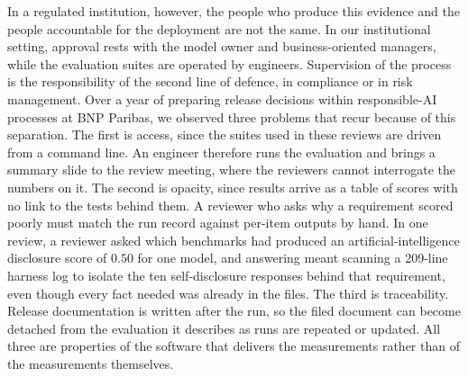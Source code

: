 \documentclass[10pt,conference,a4paper]{IEEEtran}
\begin{document}
In a regulated institution, however, the people who produce this evidence and the people accountable for the deployment are not the same.
In our institutional setting, approval rests with the model owner and business-oriented managers, while the evaluation suites are operated by engineers.
Supervision of the process is the responsibility of the second line of defence, in compliance or in risk management.
Over a year of preparing release decisions within responsible-AI processes at BNP Paribas, we observed three problems that recur because of this separation.
The first is access, since the suites used in these reviews are driven from a command line.
An engineer therefore runs the evaluation and brings a summary slide to the review meeting, where the reviewers cannot interrogate the numbers on it.
The second is opacity, since results arrive as a table of scores with no link to the tests behind them.
A reviewer who asks why a requirement scored poorly must match the run record against per-item outputs by hand.
In one review, a reviewer asked which benchmarks had produced an artificial-intelligence disclosure score of $0.50$ for one model, and answering meant scanning a 209-line harness log to isolate the ten self-disclosure responses behind that requirement, even though every fact needed was already in the files.
The third is traceability.
Release documentation is written after the run, so the filed document can become detached from the evaluation it describes as runs are repeated or updated.
All three are properties of the software that delivers the measurements rather than of the measurements themselves.
\end{document}
